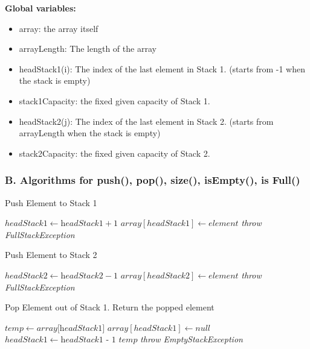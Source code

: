 \documentclass[16pt, letterpaper]{article}
\begin{document}
\textbf{Global variables:}
\begin{itemize} 
    \item array: the array itself
    \item arrayLength: The length of the array
    \item headStack1(i): The index of the last element in Stack 1. (starts from -1 when the stack is empty)
    \item stack1Capacity: the fixed given capacity of Stack 1.
    \item headStack2(j): The index of the last element in Stack 2. (starts from arrayLength when the stack is empty)
    \item stack2Capacity: the fixed given capacity of Stack 2.
\end{itemize}

\subsubsection*{B. Algorithms for push(), pop(), size(), isEmpty(), is Full()}
\begin{algorithm} [H]
\caption{Push Element to Stack 1}
\begin{algorithmic}[1]
	 {}
		\State$headStack1 \gets \textit{headStack1} + 1$
		\State$array[headStack1] \gets \textit{element}$
	\Else
		\State\textit{throw FullStackException}
	\EndIf
	\EndProcedure
\end{algorithmic}
\end{algorithm}

\begin{algorithm} [H]
\caption{Push Element to Stack 2}
\begin{algorithmic}[1]
     {}
        \State $headStack2 \gets \textit{headStack2} - 1$
        \State $array[headStack2] \gets \textit{element}$
    \Else 
        \State\textit{throw FullStackException}
    \EndIf
    \EndProcedure
\end{algorithmic}
\end{algorithm}

\begin{algorithm} [H]
\caption{Pop Element out of Stack 1. Return the popped element}
\begin{algorithmic}[1]
        \State $temp \gets \textit{array[headStack1]}$
        \State $array[headStack1] \gets \textit{null}$
        \State $headStack1 \gets \textit{headStack1 - 1}$ 
        \State \Return $temp$
    \Else
        \State \textit{throw EmptyStackException}
    \EndIf
    \EndProcedure
\end{algorithmic}
\end{algorithm}
\end{document}
